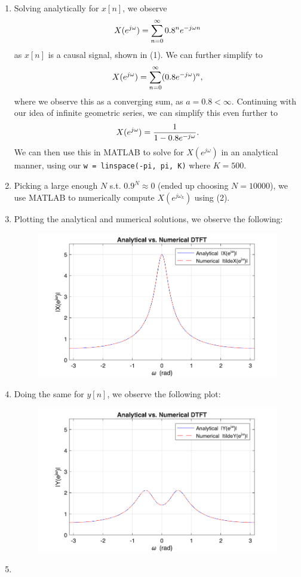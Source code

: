 \documentclass[11pt]{article}
\begin{document}
\begin{enumerate}[label=\textbf{\alph*)}, leftmargin=2.6em]
    \item Solving analytically for $x[n]$, we observe
    \begin{equation} \notag
        X(e^{j\omega}) = \sum_{n=0}^{\infty}0.8^n e^{-j\omega n}
    \end{equation}
    as $x[n]$ is a causal signal, shown in (1). We can further simplify to 
    \begin{equation} \notag
        X(e^{j\omega}) = \sum_{n=0}^{\infty}(0.8e^{-j\omega})^n,
    \end{equation}
    where we observe this as a converging sum, as $a=0.8<\infty$.
    Continuing with our idea of infinite geometric series, we can simplify this even further to
    \begin{equation} \notag
        X(e^{j\omega}) = \frac{1}{1-0.8e^{-j\omega}}.
    \end{equation}
    We can then use this in MATLAB to solve for $X(e^{j\omega})$ in an analytical manner, using our
    \texttt{w = linspace(-pi, pi, K)} where $K = 500$.

    \item Picking a large enough $N$ s.t. $0.9^N\approx 0$ (ended up choosing $N=10000$), we use MATLAB to numerically compute 
    $X(e^{j\omega_k})$ using (2).

    \item Plotting the analytical and numerical solutions, we observe the following:
    \begin{figure} [H]
        \centering
        \includegraphics[width=0.6\linewidth]{partc.png}
    \end{figure}

    \item Doing the same for $y[n]$, we observe the following plot:
        \begin{figure} [H]
        \centering
        \includegraphics[width=0.6\linewidth]{partd.png}
    \end{figure}

    \item 

\end{enumerate}
\end{document}
